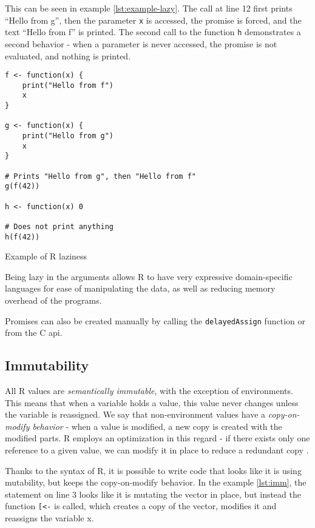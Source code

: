 This can be seen in example \ref{lst:example-lazy}. The call at line 12 first prints \enquote{Hello from g}, then the parameter \texttt{x} is accessed, the promise is forced, and the text \enquote{Hello from f} is printed. The second call to the function \texttt{h} demonstrates a second behavior - when a parameter is never accessed, the promise is not evaluated, and nothing is printed.

\begin{listing}
	\centering
	\begin{verbatim}
f <- function(x) {
    print("Hello from f")
    x
}

g <- function(x) {
    print("Hello from g")
    x
}

# Prints "Hello from g", then "Hello from f"
g(f(42))

h <- function(x) 0

# Does not print anything
h(f(42))
  \end{verbatim}
	\caption{Example of R laziness}\label{lst:example-lazy}
\end{listing}

Being lazy in the arguments allows R to have very expressive domain-specific languages for ease of manipulating the data, as well as reducing memory overhead of the programs.

Promises can also be created manually by calling the \texttt{delayedAssign} function or from the C api.

\subsection*{Immutability}

All R values are \textit{semantically immutable}, with the exception of environments. This means that when a variable holds a value, this value never changes unless the variable is reassigned. We say that non-environment values have a \textit{copy-on-modify behavior} - when a value is modified, a new copy is created with the modified parts. R employs an optimization in this regard - if there exists only one reference to a given value, we can modify it in place to reduce a redundant copy .

Thanks to the syntax of R, it is possible to write code that looks like it is using mutability, but keeps the copy-on-modify behavior. In the example \ref{lst:imm}, the statement on line 3 looks like it is mutating the vector in place, but instead the function \texttt{[<-} is called, which creates a copy of the vector, modifies it and reassigns the variable x.

